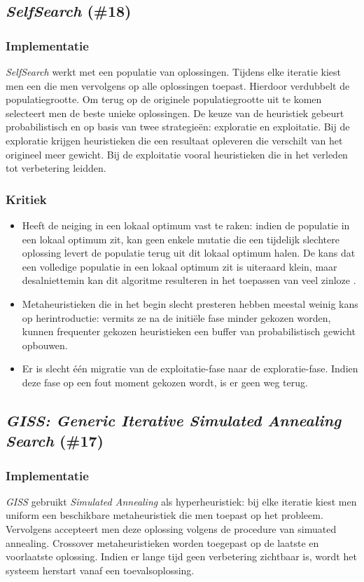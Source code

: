 \subsection{\emph{SelfSearch} (\#18)}
\label{sss:selfsearch}
\subsubsection{Implementatie}
\emph{SelfSearch}\cite{chesc-selfsearch} werkt met een populatie van oplossingen. Tijdens elke iteratie kiest men een \abllh{} die men vervolgens op alle oplossingen toepast. Hierdoor verdubbelt de populatiegrootte. Om terug op de originele populatiegrootte uit te komen selecteert men de beste unieke oplossingen. De keuze van de heuristiek gebeurt probabilistisch en op basis van twee strategie\"en: exploratie en exploitatie. Bij de exploratie krijgen heuristieken die een resultaat opleveren die verschilt van het origineel meer gewicht. Bij de exploitatie vooral heuristieken die in het verleden tot verbetering leidden.
\subsubsection{Kritiek}
\begin{itemize}
 \item Heeft de neiging in een lokaal optimum vast te raken: indien de populatie in een lokaal optimum zit, kan geen enkele mutatie die een tijdelijk slechtere oplossing levert de populatie terug uit dit lokaal optimum halen. De kans dat een volledige populatie in een lokaal optimum zit is uiteraard klein, maar desalniettemin kan dit algoritme resulteren in het toepassen van veel zinloze \abllh{}.
 \item Metaheuristieken die in het begin slecht presteren hebben meestal weinig kans op herintroductie: vermits ze na de initi\"ele fase minder gekozen worden, kunnen frequenter gekozen heuristieken een buffer van probabilistisch gewicht opbouwen.
 \item Er is slecht \'e\'en migratie van de exploitatie-fase naar de exploratie-fase. Indien deze fase op een fout moment gekozen wordt, is er geen weg terug.
\end{itemize}
\subsection{\emph{GISS: Generic Iterative Simulated Annealing Search} (\#17)}
\label{sss:giss}
\subsubsection{Implementatie}
\emph{GISS}\cite{chesc-giss} gebruikt \emph{Simulated Annealing}\cite{citeulike:1612433} als hyperheuristiek: bij elke iteratie kiest men uniform een beschikbare metaheuristiek die men toepast op het probleem. Vervolgens accepteert men deze oplossing volgens de procedure van simuated annealing. Crossover metaheuristieken worden toegepast op de laatste en voorlaatste oplossing. Indien er lange tijd geen verbetering zichtbaar is, wordt het systeem herstart vanaf een toevalsoplossing.
